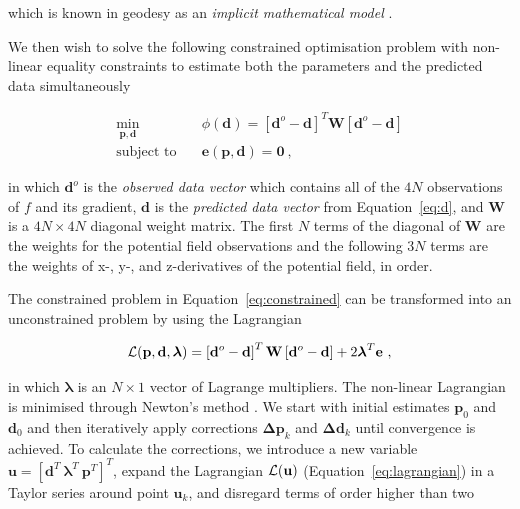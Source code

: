 \noindent
which is known in geodesy as an \textit{implicit mathematical model}
\citep{Vanicek1986}.

We then wish to solve the following constrained optimisation problem with
non-linear equality constraints to estimate both the parameters and the
predicted data simultaneously

\begin{equation}
  \begin{aligned}
    \min_{\mathbf{p}, \mathbf{d}} \quad &
      \phi(\mathbf{d}) =
      \left[\mathbf{d}^o - \mathbf{d}\right]^T \mathbf{W}
      \left[\mathbf{d}^o - \mathbf{d}\right]
    \\
    \textrm{subject to} \quad &
      \mathbf{e}(\mathbf{p}, \mathbf{d}) = \mathbf{0}
    \ ,
  \end{aligned}
  \label{eq:constrained}
\end{equation}

\noindent
in which $\mathbf{d}^o$ is the \textit{observed data vector} which contains all
of the $4N$ observations of $f$ and its gradient,
$\mathbf{d}$ is the \textit{predicted data vector} from Equation~\ref{eq:d},
and $\mathbf{W}$ is a $4N \times 4N$ diagonal weight matrix.
The first $N$ terms of the diagonal of $\mathbf{W}$ are the weights for the
potential field observations and the following $3N$ terms are the weights of
x-, y-, and z-derivatives of the potential field, in order.

The constrained problem in Equation~\ref{eq:constrained} can be transformed
into an unconstrained problem by using the Lagrangian

\begin{equation}
  \operatorname{\mathcal{L}}(\mathbf{p}, \mathbf{d}, \boldsymbol{\lambda}) =
    \left[\mathbf{d}^o - \mathbf{d}\right]^T \mathbf{W}
    \left[\mathbf{d}^o - \mathbf{d}\right]
    +
    2 \boldsymbol{\lambda}^T \mathbf{e}
  \ ,
  \label{eq:lagrangian}
\end{equation}

\noindent
in which $\boldsymbol{\lambda}$ is an $N \times 1$ vector of Lagrange
multipliers.
The non-linear Lagrangian is minimised through Newton's method
\citep{Aster2018}.
We start with initial estimates $\mathbf{p}_0$ and $\mathbf{d}_0$ and then
iteratively apply corrections $\mathbf{\Delta p}_k$ and $\mathbf{\Delta d}_k$
until convergence is achieved.
To calculate the corrections, we introduce a new variable $\mathbf{u} =
[\mathbf{d}^T\  \boldsymbol{\lambda}^T \ \mathbf{p}^T]^T$, expand the
Lagrangian $\operatorname{\mathcal{L}}(\mathbf{u})$ (Equation~\ref{eq:lagrangian}) in a Taylor
series around point $\mathbf{u}_k$, and disregard terms of order higher than
two

